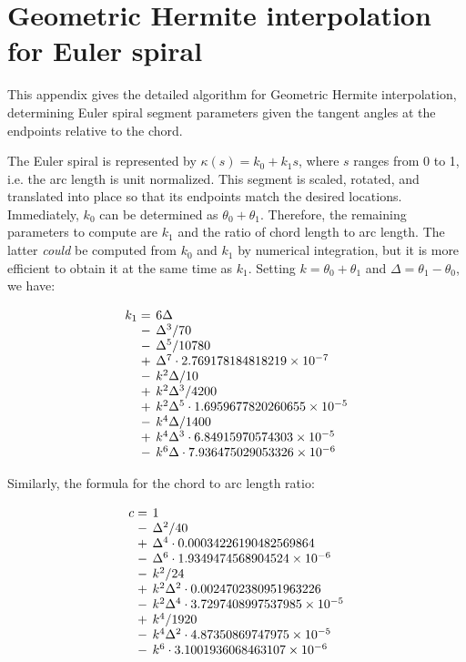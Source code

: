 \documentclass[sigconf]{acmart}
\begin{document}
\appendix

\section{Geometric Hermite interpolation for Euler spiral}
\label{appendix:gh}

This appendix gives the detailed algorithm for Geometric Hermite interpolation, determining Euler spiral segment parameters given the tangent angles at the endpoints relative to the chord.

The Euler spiral is represented by $\kappa(s) = k_0 + k_1s$, where $s$ ranges from 0 to 1, i.e. the arc length is unit normalized. This segment is scaled, rotated, and translated into place so that its endpoints match the desired locations. Immediately, $k_0$ can be determined as $\theta_0 + \theta_1$. Therefore, the remaining parameters to compute are $k_1$ and the ratio of chord length to arc length. The latter \emph{could} be computed from $k_0$ and $k_1$ by numerical integration, but it is more efficient to obtain it at the same time as $k_1$. Setting $k = \theta_0 + \theta_1$ and $\Delta = \theta_1 - \theta_0$, we have:

\[
    \setlength\arraycolsep{2pt}
    \begin{array}{rl}
    k_1 = & 6\Delta \\
     - & \Delta^3 / 70 \\
     - & \Delta^5 / 10780 \\
     + & \Delta^7 \cdot 2.769178184818219\times 10^{-7} \\
     - & k^2\Delta / 10 \\
     + & k^2\Delta^3 / 4200 \\
     + & k^2\Delta^5 \cdot 1.6959677820260655\times 10^{-5} \\
     - & k^4\Delta / 1400 \\
     + & k^4\Delta^3 \cdot 6.84915970574303\times 10^{-5} \\
     - & k^6\Delta \cdot 7.936475029053326\times 10^{-6}
    \end{array}
\]

Similarly, the formula for the chord to arc length ratio:

\[
    \setlength\arraycolsep{2pt}
    \begin{array}{rl}
    c = & 1 \\
    - & \Delta^2 / 40 \\
    + & \Delta^4 \cdot 0.00034226190482569864 \\
    - & \Delta^6 \cdot 1.9349474568904524\times 10^{-6} \\
    - & k^2 / 24 \\
    + & k^2\Delta^2 \cdot 0.0024702380951963226 \\
    - & k^2\Delta^4 \cdot 3.7297408997537985\times 10^{-5} \\
    + & k^4 / 1920 \\
    - & k^4\Delta^2 \cdot 4.87350869747975\times 10^{-5} \\
    - & k^6 \cdot 3.1001936068463107\times 10^{-6}
    \end{array}
\]
\end{document}
